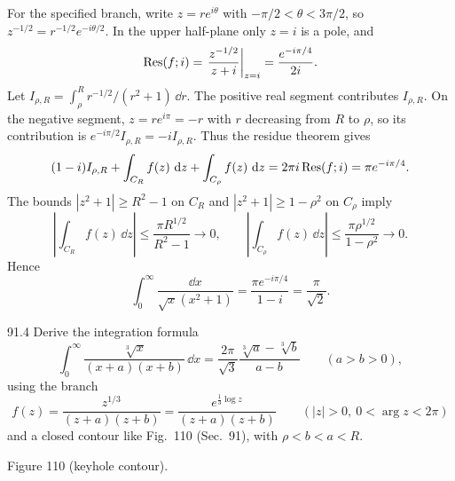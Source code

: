 \documentclass[11pt,oneside]{article}
\begin{document}
\begin{solution}
For the specified branch, write $z=re^{i\theta}$ with $-\pi/2<\theta<3\pi/2$, so $z^{-1/2}=r^{-1/2}e^{-i\theta/2}$. In the upper half-plane only $z=i$ is a pole, and
\[
    \operatorname{Res}(f;i)=\left.\frac{z^{-1/2}}{z+i}\right|_{z=i}
       =\frac{e^{-i\pi/4}}{2i}.
\]
Let $I_{\rho,R}=\int_\rho^R r^{-1/2}/(r^2+1)\,\dd r$. The positive real segment contributes $I_{\rho,R}$. On the negative segment, $z=re^{i\pi}=-r$ with $r$ decreasing from $R$ to $\rho$, so its contribution is $e^{-i\pi/2}I_{\rho,R}=-iI_{\rho,R}$. Thus the residue theorem gives
\[
    (1-i)I_{\rho,R}+\int_{C_R}f(z)\,\mathop{}\!\mathrm{d} z
         +\int_{C_\rho}f(z)\,\mathop{}\!\mathrm{d} z
       =2\pi i\operatorname{Res}(f;i)=\pi e^{-i\pi/4}.
\]
The bounds $|z^2+1|\ge R^2-1$ on $C_R$ and $|z^2+1|\ge1-\rho^2$ on $C_\rho$ imply
\[
    \left|\int_{C_R}f(z)\,\dd z\right|
       \le\frac{\pi R^{1/2}}{R^2-1}\longrightarrow0,
    \qquad
    \left|\int_{C_\rho}f(z)\,\dd z\right|
       \le\frac{\pi\rho^{1/2}}{1-\rho^2}\longrightarrow0.
\]
Hence
\[
    \boxed{\int_0^\infty\frac{\dd x}{\sqrt{x}(x^2+1)}
      =\frac{\pi e^{-i\pi/4}}{1-i}
      =\frac\pi{\sqrt2}.}
\]
\end{solution}

\begin{exercise}{91.4}
Derive the integration formula
\[
    \int_0^\infty\frac{\sqrt[3]{x}}{(x+a)(x+b)}\,\dd x
       =\frac{2\pi}{\sqrt3}\frac{\sqrt[3]{a}-\sqrt[3]{b}}{a-b}
       \qquad(a>b>0),
\]
using the branch
\[
    f(z)=\frac{z^{1/3}}{(z+a)(z+b)}
       =\frac{e^{\frac13\log z}}{(z+a)(z+b)}
       \qquad(|z|>0,\ 0<\arg z<2\pi)
\]
and a closed contour like Fig.~110 (Sec.~91), with $\rho<b<a<R$.
\begin{center}
\par\small Figure 110 (keyhole contour).
\end{center}
\end{exercise}
\end{document}
